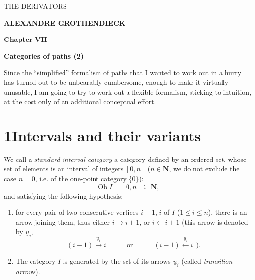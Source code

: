 \documentclass[11pt]{article}
\newcommand{\printedpage}[1]{\marginpar{\footnotesize p.~#1}}
\newcommand{\msp}[1]{\marginpar{\footnotesize [#1]}}
\newcommand{\Ob}{\operatorname{Ob}}
\begin{document}
\printedpage{}

\begin{center}
{\Large\textsf{THE DERIVATORS}}

\bigskip

\textbf{ALEXANDRE GROTHENDIECK}

\bigskip\bigskip

\textbf{Chapter VII}

\medskip

\textbf{Categories of paths (2)}
\end{center}

\newpage


\printedpage{1}

\msp{page 1}
Since the ``simplified'' formalism of paths that I wanted to work out in a hurry has turned out to be unbearably cumbersome, enough to make it virtually unusable, I am going to try to work out a flexible formalism, sticking to intuition, at the cost only of an additional conceptual effort.

\section*{1\quad Intervals and their variants} %

We call a \textit{standard interval category} a category defined by an ordered set, whose set of elements is an interval of integers $[0,n]$ ($n\in\mathbf{N}$, we do not exclude the case $n=0$, i.e. of the one-point category $\{0\}$): %
\[
\Ob I=[0,n]\subseteq\mathbf{N},
\]
and satisfying the following hypothesis:

\begin{enumerate}
\item[a)] for every pair of two consecutive vertices $i-1$, $i$ of $I$ ($1\leq i\leq n$), there is an arrow joining them, thus either $i\longrightarrow i+1$, or $i\longleftarrow i+1$ (this arrow is denoted by $\underline{u}_i$,
\[
(i-1)\xrightarrow{\underline{u}_i}i\qquad\quad\text{or}\qquad\quad(i-1)\xleftarrow{\underline{u}_i}i\ \ ).
\]
\item[b)] The category $I$ is generated by the set of its arrows $\underline{u}_i$ (called \textit{transition arrows}).
\end{enumerate}
\end{document}
